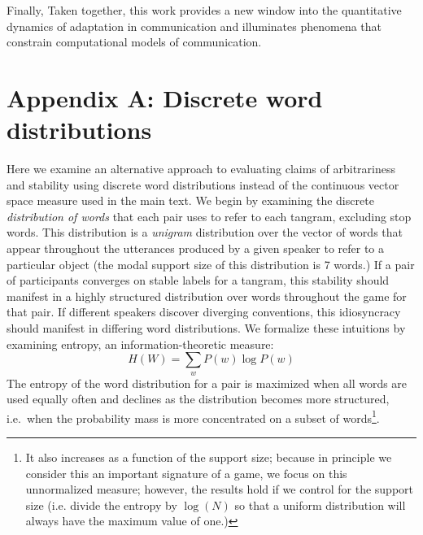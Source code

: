 \documentclass[alpha-refs]{wiley-article}
\begin{document}
Finally, 
Taken together, this work provides a new window into the quantitative dynamics of adaptation in communication and illuminates phenomena that constrain computational models of communication. 
%

\printendnotes



\section*{Appendix A: Discrete word distributions}

Here we examine an alternative approach to evaluating claims of arbitrariness 
 and stability using discrete word distributions instead of the continuous vector space measure used in the main text.
We begin by examining the discrete \emph{distribution of words} that each pair uses to refer to each tangram, excluding stop words.
This distribution is a \emph{unigram} distribution over the vector of words that appear throughout the utterances produced by a given speaker to refer to a particular object (the modal support size of this distribution is 7 words.)
If a pair of participants converges on stable labels for a tangram, this stability should manifest in a highly structured distribution over words throughout the game for that pair.
If different speakers discover diverging conventions, this idiosyncracy should manifest in differing word distributions.
We formalize these intuitions by examining entropy, an information-theoretic measure: $$H(W) = \sum_w P(w) \log P(w)$$
The entropy of the word distribution for a pair is maximized when all words are used equally often and declines as the distribution becomes more structured, i.e.~when the probability mass is more concentrated on a subset of words\footnote{It also increases as a function of the support size; because in principle we consider this an important signature of a game, we focus on this unnormalized measure; however, the results hold if we control for the support size (i.e. divide the entropy by $\log(N)$ so that a uniform distribution will always have the maximum value of one.)}.
\end{document}
